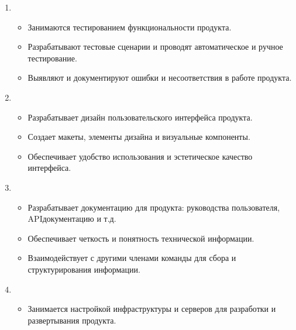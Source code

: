 \documentclass[letterpaper,10pt,russian]{sphinxmanual}
\begin{document}
\begin{enumerate}
\begin{itemize}
\end{itemize}

\item {} 
\sphinxAtStartPar
{}
\begin{itemize}
\item {} 
\sphinxAtStartPar
Занимаются тестированием функциональности продукта.

\item {} 
\sphinxAtStartPar
Разрабатывают тестовые сценарии и проводят автоматическое и ручное тестирование.

\item {} 
\sphinxAtStartPar
Выявляют и документируют ошибки и несоответствия в работе продукта.

\end{itemize}

\item {} 
\sphinxAtStartPar
{}
\begin{itemize}
\item {} 
\sphinxAtStartPar
Разрабатывает дизайн пользовательского интерфейса продукта.

\item {} 
\sphinxAtStartPar
Создает макеты, элементы дизайна и визуальные компоненты.

\item {} 
\sphinxAtStartPar
Обеспечивает удобство использования и эстетическое качество интерфейса.

\end{itemize}

\item {} 
\sphinxAtStartPar
{}
\begin{itemize}
\item {} 
\sphinxAtStartPar
Разрабатывает документацию для продукта: руководства пользователя, API\sphinxhyphen{}документацию и т.д.

\item {} 
\sphinxAtStartPar
Обеспечивает четкость и понятность технической информации.

\item {} 
\sphinxAtStartPar
Взаимодействует с другими членами команды для сбора и структурирования информации.

\end{itemize}

\item {} 
\sphinxAtStartPar
{}
\begin{itemize}
\item {} 
\sphinxAtStartPar
Занимается настройкой инфраструктуры и серверов для разработки и развертывания продукта.


\end{itemize}
\end{enumerate}
\end{document}
